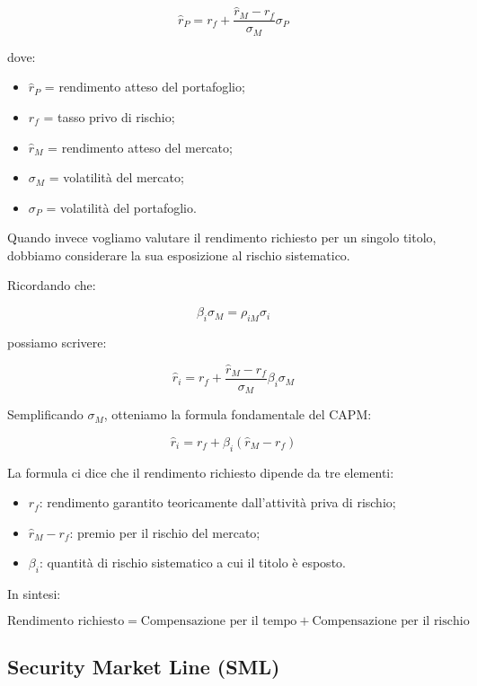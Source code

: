 \[
\boxed{
\hat{r}_P=
r_f+\frac{\hat{r}_M-r_f}{\sigma_M}\sigma_P
}
\]

\noindent dove:

\begin{itemize}
    \item $\hat{r}_P$ = rendimento atteso del portafoglio;
    \item $r_f$ = tasso privo di rischio;
    \item $\hat{r}_M$ = rendimento atteso del mercato;
    \item $\sigma_M$ = volatilità del mercato;
    \item $\sigma_P$ = volatilità del portafoglio.
\end{itemize}

\noindent Quando invece vogliamo valutare il
rendimento richiesto per un singolo titolo,
dobbiamo considerare la sua esposizione
al rischio sistematico.

\medskip

\noindent Ricordando che:

\[
\beta_i\sigma_M=\rho_{iM}\sigma_i
\]

\noindent possiamo scrivere:

\[
\hat{r}_i=
r_f+\frac{\hat{r}_M-r_f}{\sigma_M}
\beta_i\sigma_M
\]

\noindent Semplificando $\sigma_M$, otteniamo
la formula fondamentale del CAPM:

\[
\boxed{
\hat{r}_i=r_f+\beta_i(\hat{r}_M-r_f)
}
\]

\noindent La formula ci dice che il rendimento
richiesto dipende da tre elementi:

\begin{itemize}
    \item $r_f$: rendimento garantito teoricamente
    dall'attività priva di rischio;

    \item $\hat{r}_M-r_f$: premio per il rischio
    del mercato;

    \item $\beta_i$: quantità di rischio sistematico
    a cui il titolo è esposto.
\end{itemize}

\noindent In sintesi:

\[
\boxed{
\text{Rendimento richiesto}
=
\text{Compensazione per il tempo}
+
\text{Compensazione per il rischio}
}
\]


\subsection{Security Market Line (SML)}

